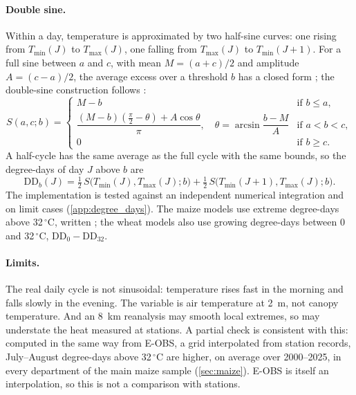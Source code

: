\paragraph{Double sine.} Within a day, temperature is approximated by two half-sine curves: one rising from $T_{\min}(J)$ to $T_{\max}(J)$, one falling from $T_{\max}(J)$ to $T_{\min}(J+1)$. For a full sine between $a$ and $c$, with mean $M = (a+c)/2$ and amplitude $A = (c-a)/2$, the average excess over a threshold $b$ has a closed form \parencite{baskerville1969}; the double-sine construction follows \textcite{gammans2017}:
\begin{equation}
S(a, c; b) =
\begin{cases}
M - b & \text{if } b \le a,\\[2pt]
\dfrac{(M - b)\left(\frac{\pi}{2} - \theta\right) + A\cos\theta}{\pi}, \quad \theta = \arcsin\dfrac{b - M}{A} & \text{if } a < b < c,\\[8pt]
0 & \text{if } b \ge c.
\end{cases}
\end{equation}
A half-cycle has the same average as the full cycle with the same bounds, so the degree-days of day $J$ above $b$ are
\begin{equation}
\mathrm{DD}_b(J) = \tfrac{1}{2}\, S\big(T_{\min}(J), T_{\max}(J); b\big) + \tfrac{1}{2}\, S\big(T_{\min}(J+1), T_{\max}(J); b\big).
\end{equation}
The implementation is tested against an independent numerical integration and on limit cases (\cref{app:degree_days}). The maize models use extreme degree-days above 32\,$^{\circ}$C, written \ddthirtytwo; the wheat models also use growing degree-days between 0 and 32\,$^{\circ}$C, $\mathrm{DD}_0 - \mathrm{DD}_{32}$.

\paragraph{Limits.} The real daily cycle is not sinusoidal: temperature rises fast in the morning and falls slowly in the evening. The variable is air temperature at 2~m, not canopy temperature. And an 8~km reanalysis may smooth local extremes, so \ddthirtytwo{} may understate the heat measured at stations. A partial check is consistent with this: computed in the same way from E-OBS, a grid interpolated from station records, July--August degree-days above 32\,$^{\circ}$C are higher, on average over 2000--2025, in every department of the main maize sample (\cref{sec:maize}). E-OBS is itself an interpolation, so this is not a comparison with stations.

